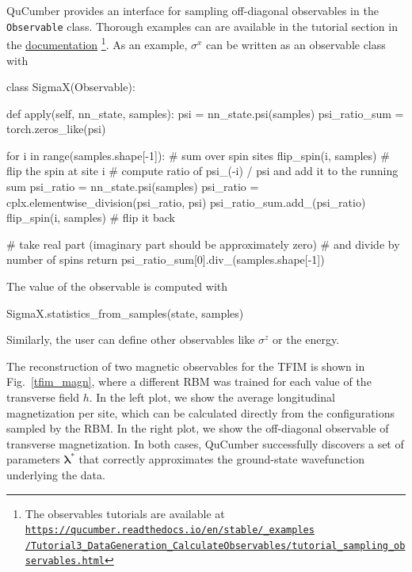 \documentclass[submission, Phys, hidelnks]{SciPost}
\begin{document}
QuCumber provides an interface for sampling off-diagonal observables in the \verb|Observable| class. Thorough examples can are available in the tutorial section in the \href{https://qucumber.readthedocs.io/en/stable/}{documentation}\!\!
\footnote{The observables tutorials are available at
    \href{https://qucumber.readthedocs.io/en/stable/\_examples/Tutorial3\_DataGeneration\_CalculateObservables/tutorial\_sampling\_observables.html
}{\texttt{https://qucumber.readthedocs.io/en/stable/\_examples\\/Tutorial3\_DataGeneration\_CalculateObservables/tutorial\_sampling\_observables.html}}
}. 
As an example, $\sigma^x$ can be written as an observable class with
\begin{python}
class SigmaX(Observable):

    def apply(self, nn_state, samples):
        psi = nn_state.psi(samples)
        psi_ratio_sum = torch.zeros_like(psi)

        for i in range(samples.shape[-1]):  # sum over spin sites
            flip_spin(i, samples)  # flip the spin at site i
            # compute ratio of psi_(-i) / psi and add it to the running sum
            psi_ratio = nn_state.psi(samples)
            psi_ratio = cplx.elementwise_division(psi_ratio, psi)
            psi_ratio_sum.add_(psi_ratio)
            flip_spin(i, samples)  # flip it back

        # take real part (imaginary part should be approximately zero)
        # and divide by number of spins
        return psi_ratio_sum[0].div_(samples.shape[-1])
\end{python}
The value of the observable is computed with 
\begin{python}
SigmaX.statistics_from_samples(state, samples)
\end{python}
Similarly, the user can define other observables like $\sigma^z$ or the energy. 

The reconstruction of two magnetic observables for the TFIM is shown in Fig.~\ref{tfim_magn}, where a different RBM was trained for each value of the transverse field $h$. In the left plot, we show the average longitudinal magnetization per site, which can be calculated directly from the configurations sampled by the RBM. In the right plot, we show the off-diagonal observable of transverse magnetization. In both cases, QuCumber successfully discovers a set of parameters $\bm{\lambda}^*$ that correctly approximates the ground-state wavefunction underlying the data.
\end{document}
